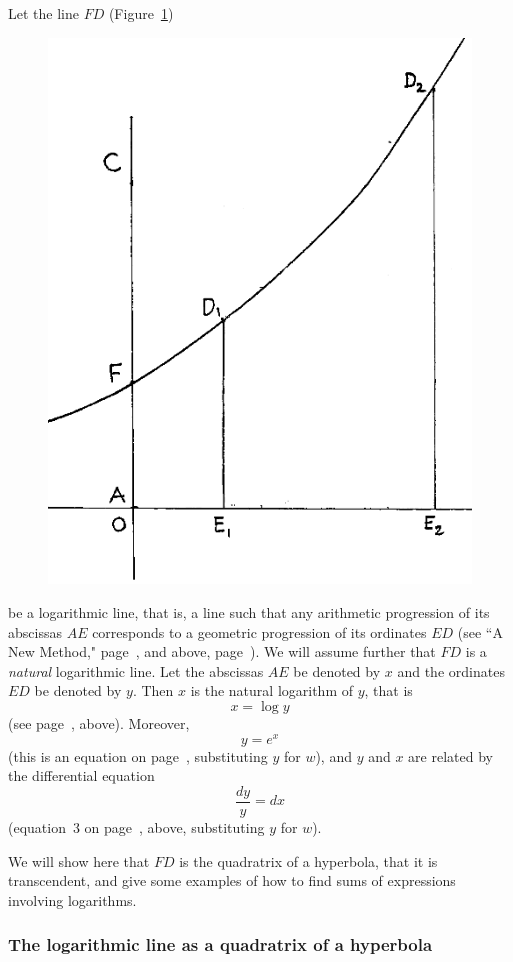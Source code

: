 \documentclass[polutonikogreek,english,twoside,openright]{article}
\begin{document}
Let the line $FD$ (Figure~\ref{logline})
\begin{figure}[htp]
\begin{center}
\includegraphics[width=.65\textwidth]{fig/Figure51}
\caption{}
\label{logline}
\vspace{-10pt}
\end{center}
\end{figure}  be a logarithmic line, that is, a line such that any arithmetic progression of its abscissas $AE$ corresponds to a geometric progression of its ordinates $ED$ (see ``A New Method," page~\pageref{enddeb}, and above, page~\pageref{bdebeaune}).   We will assume further that $FD$ is a {\em natural} logarithmic line.  Let the abscissas $AE$ be denoted by $x$ and the ordinates $ED$ be denoted by $y$.  Then $x$ is the natural logarithm of $y$, that is
$$x = \log y$$ 
(see page~\pageref{oeq}, above). 
Moreover,
$$y=e^x$$
(this is an equation on page~\pageref{oeq}, substituting $y$ for $w$), and $y$ and $x$ are related by the differential equation
$$\frac{dy}{y} = dx$$
(equation~3 on page~\pageref{deq}, above, substituting $y$ for $w$).  

We will show here that $FD$ is the quadratrix of a hyperbola, that it is transcendent, and give some examples of how to find sums of expressions involving logarithms.




\subsubsection*{The logarithmic line as a quadratrix of a hyperbola}
\end{document}

